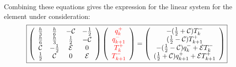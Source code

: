 Combining these equations gives the expression for the linear system for the 
element under consideration:
\begin{eqnarray}
\boxed{
\left(
\begin{array}{cccc}
\frac{h}{3}    &  \frac{h}{6} & -{\cal C}   &-\frac{1}{2} \\
\frac{h}{6}    &  \frac{h}{3} & \frac{1}{2} & -{\cal C} \\
{\cal C}    & -\frac{1}{2} & {\cal E} & 0\\
\frac{1}{2} & {\cal C} & 0 & {\cal E}
\end{array}
\right) \left(
\begin{array}{c}
     \color{red}{q_k^+}  \\
     \color{red}{q_{k+1}^-} \\
     \color{red}{T_k^+} \\
     \color{red}{T_{k+1}^-}
\end{array}
\right)=\left(
\begin{array}{c}
     -(\frac{1}{2}+{\cal{C}}) T_k^-  \\
      (\frac{1}{2}-{\cal{C}}) T_{k+1}^+ \\
     -(\frac{1}{2}-{\cal{C}})q_k^-+{\cal{E}} T_k^-  \\
      (\frac{1}{2}+{\cal{C}})q_{k+1}^++{\cal{E}} T_{k+1}^+
\end{array}
\right)
}  \label{eq:dgsyst1D}
\end{eqnarray}

